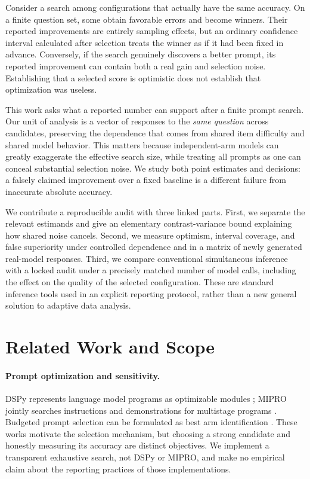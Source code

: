 \documentclass{article}
\begin{document}
Consider a search among configurations that actually have the same accuracy. On a finite question set, some obtain favorable errors and become winners. Their reported improvements are entirely sampling effects, but an ordinary confidence interval calculated after selection treats the winner as if it had been fixed in advance. Conversely, if the search genuinely discovers a better prompt, its reported improvement can contain both a real gain and selection noise. Establishing that a selected score is optimistic does not establish that optimization was useless.

This work asks what a reported number can support after a finite prompt search. Our unit of analysis is a vector of responses to the \emph{same question} across candidates, preserving the dependence that comes from shared item difficulty and shared model behavior. This matters because independent-arm models can greatly exaggerate the effective search size, while treating all prompts as one can conceal substantial selection noise. We study both point estimates and decisions: a falsely claimed improvement over a fixed baseline is a different failure from inaccurate absolute accuracy.

We contribute a reproducible audit with three linked parts. First, we separate the relevant estimands and give an elementary contrast-variance bound explaining how shared noise cancels. Second, we measure optimism, interval coverage, and false superiority under controlled dependence and in a matrix of newly generated real-model responses. Third, we compare conventional simultaneous inference with a locked audit under a precisely matched number of model calls, including the effect on the quality of the selected configuration. These are standard inference tools used in an explicit reporting protocol, rather than a new general solution to adaptive data analysis.

\section{Related Work and Scope}
\paragraph{Prompt optimization and sensitivity.}
DSPy represents language model programs as optimizable modules \citep{khattab2023dspy}; MIPRO jointly searches instructions and demonstrations for multistage programs \citep{opsahl2024mipro}. Budgeted prompt selection can be formulated as best arm identification \citep{shi2024efficient}. These works motivate the selection mechanism, but choosing a strong candidate and honestly measuring its accuracy are distinct objectives. We implement a transparent exhaustive search, not DSPy or MIPRO, and make no empirical claim about the reporting practices of those implementations.
\end{document}
